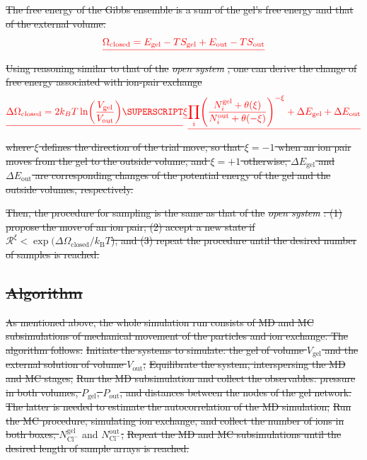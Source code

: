 \documentclass[gels,article,accept,pdftex,moreauthors]{Definitions/mdpi}
\newcommand{\kT}{k_\mathrm{B}T}
\newcommand{\Ncl}{N_\mathrm{Cl^-}}
\newcommand{\gel}{^\mathrm{gel}}
\newcommand{\out}{^{\mathrm{out}}}
\newcommand{\Vgel}{V_\mathrm{gel}}
\newcommand{\Egel}{E_\mathrm{gel}}
\newcommand{\Sgel}{S_\mathrm{gel}}
\newcommand{\Vout}{V_\mathrm{out}}
\newcommand{\Eout}{E_\mathrm{out}}
\newcommand{\Sout}{S_\mathrm{out}}
\providecommand{\DIFadd}[1]{{\protect\color{blue}\uwave{#1}}} %
\providecommand{\DIFdel}[1]{{\protect\color{red}\sout{#1}}}                      %
\providecommand{\DIFaddbegin}{} %
\providecommand{\DIFaddend}{} %
\providecommand{\DIFdelbegin}{} %
\providecommand{\DIFdelend}{} %
\begin{document}
\DIFdel{The free energy of the Gibbs ensemble is a sum of the gel's free energy and that of the external volume.
}\begin{displaymath}
    \DIFdel{\Omega_{\mathrm{closed}}=\Egel-T\Sgel + \Eout-T\Sout %
}\end{displaymath}%
\DIFdel{Using reasoning similar to that of the }\emph{\DIFdel{open system}}%
\DIFdel{, one can derive the change of free energy associated with ion-pair exchange 
}\begin{displaymath}
\DIFdel{\Delta \Omega_{\mathrm{closed}} =2 k_B T \ln \left(\frac{\Vgel}{\Vout} \right) \SUPERSCRIPT }{\DIFdel{\xi}}\DIFdel{\prod_i \left(\frac{N_{i}\gel+\theta(\xi)}{N_{i}\out+\theta(-\xi)}\right)^{-\xi} + \Delta \Egel + \Delta \Eout
}\end{displaymath}%
\DIFdel{where $\xi$ defines the direction of the trial move, so that $\xi = -1$ when an ion pair moves from the gel to the outside volume, and  $\xi = +1$ otherwise; $\Delta \Egel$ and $\Delta \Eout$ are corresponding changes of the potential energy of the gel and the outside volumes, respectively.
}%

\DIFdel{Then, the procedure for sampling is the same as that of the }\emph{\DIFdel{open system}}%
\DIFdel{: (1) propose the move of an ion pair; (2) accept a new state if $\mathcal{R}^{\xi}<\exp({\Delta\Omega_\mathrm{closed}/\kT}$); and (3) repeat the procedure until the desired number of samples is reached.
}%

\subsection{\DIFdel{Algorithm}}
\addtocounter{subsection}{-1}%
\DIFdel{As mentioned above, the whole simulation run consists of MD and MC subsimulations of mechanical movement of the particles and ion exchange. The algorithm follows:
}%
\DIFdel{Initiate the systems to simulate: the gel of volume $\Vgel$ and the external solution of volume $\Vout$;
}%
\DIFdel{Equilibrate the system, interspersing the MD and MC stages;
}%
\DIFdel{Run the MD subsimulation and collect the observables: pressure in both volumes, $P_\mathrm{gel}$, $P_\mathrm{out}$, and distances between the nodes of the gel network. The latter is needed to estimate the autocorrelation of the MD simulation;
}%
\DIFdel{Run the MC procedure, simulating ion exchange, and collect the number of ions in both boxes, 
$\Ncl\gel$ }\DIFdelend and \DIFdelbegin \DIFdel{$\Ncl\out$; 
}%
\DIFdel{Repeat the MD and MC subsimulations until the desired length of sample arrays is reached. 
 }%
\DIFdelend \DIFaddbegin \DIFadd{in Section~\ref{sec: MM}. 
 }\DIFaddend 
\end{document}

